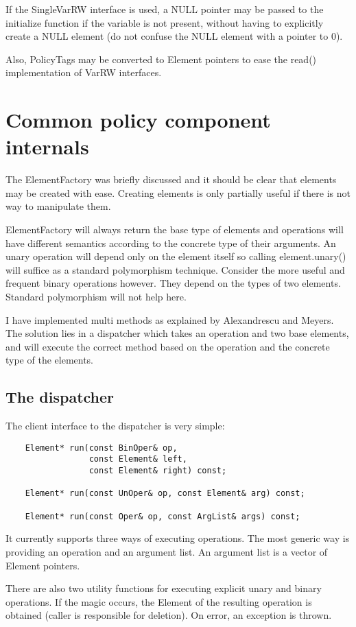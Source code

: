 \documentclass{article}
\begin{document}
If the SingleVarRW interface is used, a NULL pointer may be passed to the
initialize function if the variable is not present, without having to explicitly
create a NULL element (do not confuse the NULL element with a pointer to 0).

Also, PolicyTags may be converted to Element pointers to ease the read()
implementation of VarRW interfaces.



\section{Common policy component internals}
The ElementFactory was briefly discussed and it should be clear that elements
may be created with ease. Creating elements is only partially useful if there
is not way to manipulate them. 

ElementFactory will always return the base type of elements and operations will
have different semantics according to the concrete type of their arguments.  An
unary operation will depend only on the element itself so calling
element.unary() will suffice as a standard polymorphism technique. Consider the
more useful and frequent binary operations however. They depend on the types of
two elements. Standard polymorphism will not help here. 

I have implemented multi methods as explained by Alexandrescu and Meyers. The
solution lies in a dispatcher which takes an operation and two base elements,
and will execute the correct method based on the operation and the concrete type
of the elements.

\subsection{The dispatcher}
The client interface to the dispatcher is very simple:
\begin{verbatim}
    Element* run(const BinOper& op,
                 const Element& left, 
                 const Element& right) const;
		 
    Element* run(const UnOper& op, const Element& arg) const;

    Element* run(const Oper& op, const ArgList& args) const;
\end{verbatim}
It currently supports three ways of executing operations. The most generic way
is providing an operation and an argument list. An argument list is a vector of
Element pointers.

There are also two utility functions for executing explicit unary and binary
operations. If the magic occurs, the Element of the resulting operation is
obtained (caller is responsible for deletion). On error, an exception is thrown.
\end{document}
